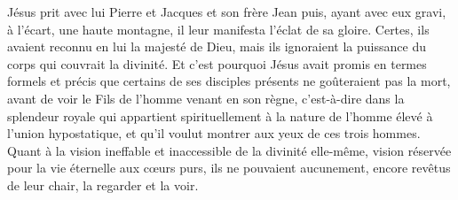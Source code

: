 Jésus prit avec lui Pierre et Jacques et son frère Jean
	puis, ayant avec eux gravi, à l’écart, une haute montagne,
	il leur manifesta l’éclat de sa gloire.
Certes, ils avaient reconnu en lui la majesté de Dieu,
	mais ils ignoraient la puissance du corps qui couvrait la divinité.
Et c’est pourquoi Jésus avait promis en termes formels et précis
	que certains de ses disciples présents ne goûteraient pas la mort,
	avant de voir le Fils de l’homme venant en son règne,
	c’est-à-dire dans la splendeur royale
		qui appartient spirituellement
		à la nature de l’homme élevé à l’union hypostatique,
	et qu’il voulut montrer aux yeux de ces trois hommes.
Quant à la vision ineffable et inaccessible de la divinité elle-même,
	vision réservée pour la vie éternelle aux cœurs purs,
	ils ne pouvaient aucunement, encore revêtus de leur chair,
	la regarder et la voir.
